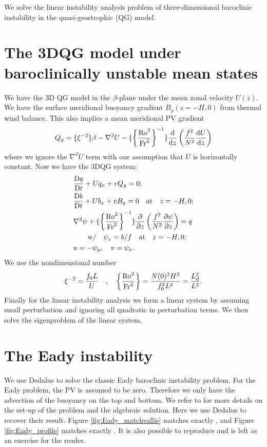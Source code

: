 \graphicspath{{3DQG_Linstab/code/figs/}}

We solve the linear instability analysis problem of three-dimensional baroclinic instability in the quasi-geostrophic (QG) model.

\section{The 3DQG model under baroclinically unstable mean states}
We have the 3D QG model in the $\beta$-plane under the mean zonal velocity $U(z)$. We have the surface meridional buoyancy gradient $B_y(z=-H, 0)$ from thermal wind balance. This also implies a mean meridional PV gradient
\begin{align}
    Q_y = \{\xi^{-2}\}\beta-\nabla^2 U-\{\left\{\frac{\text{Ro}^2}{\text{Fr}^2}\right\}^{-1}\}\frac{\mathrm{d}}{\mathrm{d} z}\left(\frac{f^2}{N^2}\frac{\mathrm{d} U}{\mathrm{d} z}\right)
\end{align}
where we ignore the $\nabla^2 U$ term with our assumption that $U$ is horizontally constant. Now we have the 3DQG system:
\begin{align}
    &\frac{\mathrm{D} q}{\mathrm{D} t}+Uq_x+vQ_y = 0; \\
    &\frac{\mathrm{D} b}{\mathrm{D} t}+Ub_x+vB_y = 0 \quad \mbox{at} \quad z=-H, 0; \\
    &\nabla^2\psi + \{\left\{\frac{\text{Ro}^2}{\text{Fr}^2}\right\}^{-1}\}\frac{\partial}{\partial z}\left(\frac{f^2}{N^2}\frac{\partial\psi}{\partial z}\right) = q \\
    &\quad\quad \mbox{w/} \quad \psi_z = b/f \quad \mbox{at} \quad z=-H, 0; \\
    &u = -\psi_y, \quad v = \psi_x.
\end{align}
We use the nondimensional number
\begin{align}
    \xi^{-2} = \frac{f_0 L}{U} \quad \mbox{,} \quad \left\{\frac{\text{Ro}^2}{\text{Fr}^2}\right\} = \frac{N(0)^2H^2}{f_0^2L^2} = \frac{L_{d}^2}{L^2}.
\end{align}
Finally for the linear instability analysis we form a linear system by assuming small perturbation and ignoring all quadratic in perturbation terms. We then solve the eigenproblem of the linear system.

\section{The Eady instability}
We use Dedalus to solve the classic Eady baroclinic instability problem. For the Eady problem, the PV is assumed to be zero. Therefore we only have the advection of the buoyancy on the top and bottom. We refer to \cite[\S 9.5]{Vallis_17} for more details on the set-up of the problem and the algebraic solution. Here we use Dedalus to recover their result. Figure \ref{fig:Eady_matchvallis} matches exactly \cite[Fig. 9.10]{Vallis_17}, and Figure \ref{fig:Eady_profile} matches exactly \cite[Fig. 9.12]{Vallis_17}. It is also possible to reproduce \cite[Fig. 9.11]{Vallis_17} and is left as an exercise for the reader.

